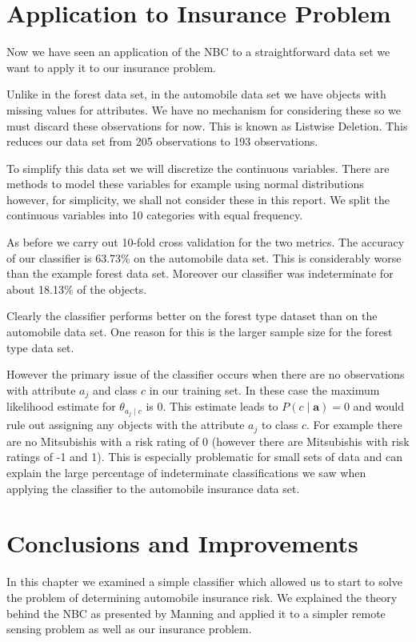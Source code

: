 \section{Application to Insurance Problem}

Now we have seen an application of the NBC to a straightforward data set we want to apply it to our insurance problem.

Unlike in the forest data set, in the automobile data set we have objects with missing values for attributes.
We have no mechanism for considering these so we must discard these observations for now.
This is known as Listwise Deletion.
This reduces our data set from 205 observations to 193 observations.

To simplify this data set we will discretize the continuous variables.
There are methods to model these variables for example using normal distributions \cite{Dumitru09} however, for simplicity, we shall not consider these in this report.
We split the continuous variables into 10 categories with equal frequency.

As before we carry out 10-fold cross validation for the two metrics.
The accuracy of our classifier is 63.73\% on the automobile data set.
This is considerably worse than the example forest data set.
Moreover our classifier was indeterminate for about 18.13\% of the objects.

Clearly the classifier performs better on the forest type dataset than on the automobile data set.
One reason for this is the larger sample size for the forest type data set.

However the primary issue of the classifier occurs when there are no observations with attribute $a_j$ and class $c$ in our training set.
In these case the maximum likelihood estimate for $\theta_{a_j \mid c}$ is $0$.
This estimate leads to $P(c \mid \mathbf{a}) = 0$ and would rule out assigning any objects with the attribute $a_j$ to class $c$.
For example there are no Mitsubishis with a risk rating of 0 (however there are Mitsubishis with risk ratings of -1 and 1).
This is especially problematic for small sets of data and can explain the large percentage of indeterminate classifications we saw when applying the classifier to the automobile insurance data set.

\section{Conclusions and Improvements}

In this chapter we examined a simple classifier which allowed us to start to solve the problem of determining automobile insurance risk.
We explained the theory behind the NBC as presented by Manning \cite{Manning08} and applied it to a simpler remote sensing problem as well as our insurance problem.

